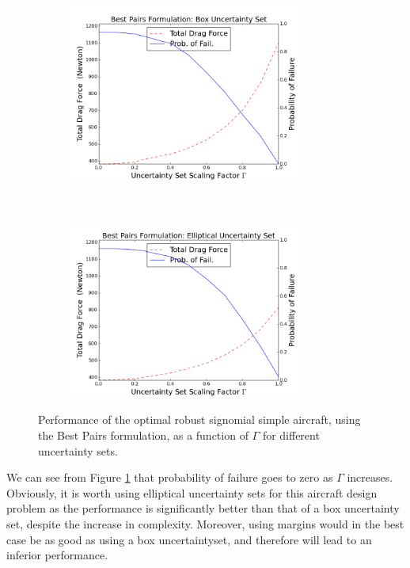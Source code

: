 \begin{figure}[ht]
    \centering
    \captionsetup{justification=centering, font=small}
    \begin{subfigure}{0.49\textwidth}
        \centering
        \includegraphics[height=2.3in]{signomial_simple_flight/box_best_pairs.png}
    \end{subfigure}%
    ~ 
    \begin{subfigure}{0.49\textwidth}
        \centering
        \includegraphics[height=2.3in]{signomial_simple_flight/ell_best_pairs.png}
    \end{subfigure}
    \caption{Performance of the optimal robust signomial simple aircraft, using the Best Pairs formulation, as a function of $\Gamma$ for different uncertainty sets.}
    \label{fig:probOfFailure}
\end{figure}

We can see from Figure \ref{fig:probOfFailure} that probability of failure goes to zero as $\Gamma$ increases.
Obviously, it is worth using elliptical uncertainty sets for this aircraft design problem as the performance is significantly better than that of a box uncertainty set, despite the increase in complexity. 
Moreover, using margins would in the best case be as good as using a box uncertaintyset, and therefore will lead to an inferior performance.

